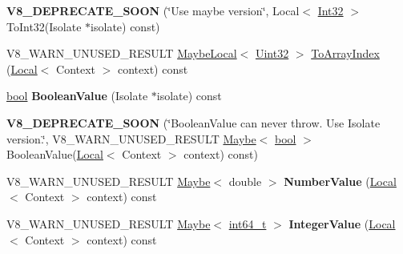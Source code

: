 \begin{DoxyCompactItemize}
\item 
\mbox{\label{classv8_1_1Value_abf72660ee84f81fe2fed85e39e6a3c86}} 
{\bfseries V8\+\_\+\+D\+E\+P\+R\+E\+C\+A\+T\+E\+\_\+\+S\+O\+ON} (\char`\"{}Use maybe version\char`\"{}, Local$<$ \mbox{\hyperlink{classv8_1_1Int32}{Int32}} $>$ To\+Int32(Isolate $\ast$isolate) const)
\item 
V8\+\_\+\+W\+A\+R\+N\+\_\+\+U\+N\+U\+S\+E\+D\+\_\+\+R\+E\+S\+U\+LT \mbox{\hyperlink{classv8_1_1MaybeLocal}{Maybe\+Local}}$<$ \mbox{\hyperlink{classv8_1_1Uint32}{Uint32}} $>$ \mbox{\hyperlink{classv8_1_1Value_a75222c1f1452036a5aab9faadbbc9136}{To\+Array\+Index}} (\mbox{\hyperlink{classv8_1_1Local}{Local}}$<$ Context $>$ context) const
\item 
\mbox{\label{classv8_1_1Value_a877ed2853a72185cd08b00b032925870}} 
\mbox{\hyperlink{classbool}{bool}} {\bfseries Boolean\+Value} (Isolate $\ast$isolate) const
\item 
\mbox{\label{classv8_1_1Value_af549abfa3ce69b26ce2399ea240990af}} 
{\bfseries V8\+\_\+\+D\+E\+P\+R\+E\+C\+A\+T\+E\+\_\+\+S\+O\+ON} (\char`\"{}Boolean\+Value can never throw. Use Isolate version.\char`\"{}, V8\+\_\+\+W\+A\+R\+N\+\_\+\+U\+N\+U\+S\+E\+D\+\_\+\+R\+E\+S\+U\+LT \mbox{\hyperlink{classv8_1_1Maybe}{Maybe}}$<$ \mbox{\hyperlink{classbool}{bool}} $>$ Boolean\+Value(\mbox{\hyperlink{classv8_1_1Local}{Local}}$<$ Context $>$ context) const)
\item 
\mbox{\label{classv8_1_1Value_a2eb9e2e2c61b0e43cf8c50e4a3a4fbc6}} 
V8\+\_\+\+W\+A\+R\+N\+\_\+\+U\+N\+U\+S\+E\+D\+\_\+\+R\+E\+S\+U\+LT \mbox{\hyperlink{classv8_1_1Maybe}{Maybe}}$<$ double $>$ {\bfseries Number\+Value} (\mbox{\hyperlink{classv8_1_1Local}{Local}}$<$ Context $>$ context) const
\item 
\mbox{\label{classv8_1_1Value_a88a4f341ac3426f4edc1ed8ab3e5fe9c}} 
V8\+\_\+\+W\+A\+R\+N\+\_\+\+U\+N\+U\+S\+E\+D\+\_\+\+R\+E\+S\+U\+LT \mbox{\hyperlink{classv8_1_1Maybe}{Maybe}}$<$ \mbox{\hyperlink{classint64__t}{int64\+\_\+t}} $>$ {\bfseries Integer\+Value} (\mbox{\hyperlink{classv8_1_1Local}{Local}}$<$ Context $>$ context) const
\item 
\mbox{\label{classv8_1_1Value_aacd6e623d8db2838896b4497c003ff8b}} 

\end{DoxyCompactItemize}
